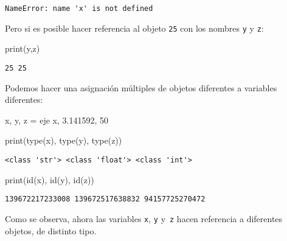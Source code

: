 \documentclass[
  letterpaper,
  DIV=11,
  numbers=noendperiod]{scrreprt}
\newenvironment{Shaded}{\begin{snugshade}}{\end{snugshade}}
\newcommand{\BuiltInTok}[1]{\textcolor[rgb]{0.00,0.23,0.31}{#1}}
\newcommand{\DecValTok}[1]{\textcolor[rgb]{0.68,0.00,0.00}{#1}}
\newcommand{\FloatTok}[1]{\textcolor[rgb]{0.68,0.00,0.00}{#1}}
\newcommand{\NormalTok}[1]{\textcolor[rgb]{0.00,0.23,0.31}{#1}}
\newcommand{\OperatorTok}[1]{\textcolor[rgb]{0.37,0.37,0.37}{#1}}
\newcommand{\StringTok}[1]{\textcolor[rgb]{0.13,0.47,0.30}{#1}}
\begin{document}
\begin{verbatim}
NameError: name 'x' is not defined
\end{verbatim}

Pero si es posible hacer referencia al objeto \texttt{25} con los
nombres \texttt{y} y \texttt{z}:

\begin{Shaded}
\begin{Highlighting}[]
\BuiltInTok{print}\NormalTok{(y,z)}
\end{Highlighting}
\end{Shaded}

\begin{verbatim}
25 25
\end{verbatim}

Podemos hacer una asignación múltiples de objetos diferentes a variables
diferentes:

\begin{Shaded}
\begin{Highlighting}[]
\NormalTok{x, y, z }\OperatorTok{=} \StringTok{\textquotesingle{}eje x\textquotesingle{}}\NormalTok{, }\FloatTok{3.141592}\NormalTok{, }\DecValTok{50}
\end{Highlighting}
\end{Shaded}

\begin{Shaded}
\begin{Highlighting}[]
\BuiltInTok{print}\NormalTok{(}\BuiltInTok{type}\NormalTok{(x), }\BuiltInTok{type}\NormalTok{(y), }\BuiltInTok{type}\NormalTok{(z))}
\end{Highlighting}
\end{Shaded}

\begin{verbatim}
<class 'str'> <class 'float'> <class 'int'>
\end{verbatim}

\begin{Shaded}
\begin{Highlighting}[]
\BuiltInTok{print}\NormalTok{(}\BuiltInTok{id}\NormalTok{(x), }\BuiltInTok{id}\NormalTok{(y), }\BuiltInTok{id}\NormalTok{(z))}
\end{Highlighting}
\end{Shaded}

\begin{verbatim}
139672217233008 139672517638832 94157725270472
\end{verbatim}

Como se observa, ahora las variables \texttt{x}, \texttt{y} y~\texttt{z}
hacen referencia a diferentes objetos, de distinto tipo.
\end{document}
